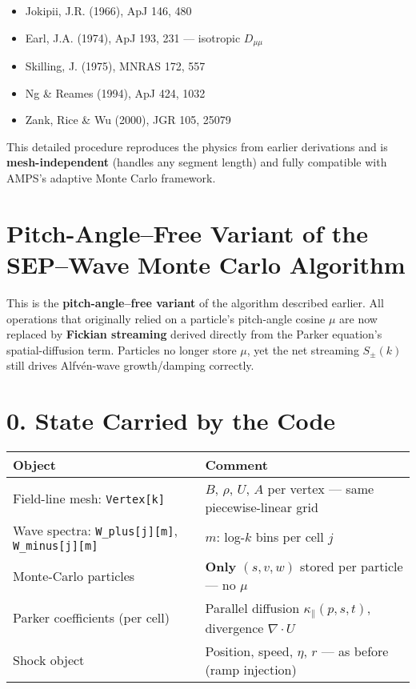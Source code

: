 \begin{itemize}
    \item Jokipii, J.R. (1966), ApJ 146, 480
    \item Earl, J.A. (1974), ApJ 193, 231 — isotropic $D_{\mu\mu}$
    \item Skilling, J. (1975), MNRAS 172, 557
    \item Ng \& Reames (1994), ApJ 424, 1032
    \item Zank, Rice \& Wu (2000), JGR 105, 25079
\end{itemize}

\vspace{0.5em}
\noindent
This detailed procedure reproduces the physics from earlier derivations and is \textbf{mesh-independent} (handles any segment length) and fully compatible with AMPS's adaptive Monte Carlo framework.


\section*{Pitch-Angle–Free Variant of the SEP–Wave Monte Carlo Algorithm}

This is the \textbf{pitch-angle–free variant} of the algorithm described earlier. All operations that originally relied on a particle’s pitch-angle cosine $\mu$ are now replaced by \textbf{Fickian streaming} derived directly from the Parker equation’s spatial-diffusion term. Particles no longer store $\mu$, yet the net streaming $S_\pm(k)$ still drives Alfvén-wave growth/damping correctly.

\section*{0. State Carried by the Code}

\begin{center}
\begin{tabular}{p{5.2cm} p{9.4cm}}
\toprule
\textbf{Object} & \textbf{Comment} \\
\midrule
Field-line mesh: \texttt{Vertex[k]} & $B$, $\rho$, $U$, $A$ per vertex — same piecewise-linear grid \\
Wave spectra: \texttt{W\_plus[j][m]}, \texttt{W\_minus[j][m]} & $m$: log-$k$ bins per cell $j$ \\
Monte-Carlo particles & \textbf{Only} $(s, v, w)$ stored per particle — no $\mu$ \\
Parker coefficients (per cell) & Parallel diffusion $\kappa_\parallel(p, s, t)$, divergence $\nabla \cdot U$ \\
Shock object & Position, speed, $\eta$, $r$ — as before (ramp injection) \\
\bottomrule
\end{tabular}
\end{center}

